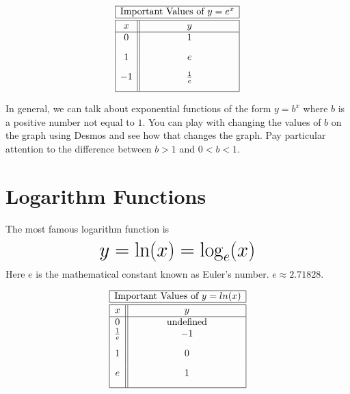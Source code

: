 \documentclass[nooutcomes]{ximera}
\begin{document}
$$
\begin{array}{ |c || c|  }
 \hline
 \multicolumn{2}{|c|}{\text{\normalfont Important Values of } y=e^x} \\
\hline
 \hline
 x & y\\
 \hline
 0&1\\[2ex]
 1&e\\[2ex]
 -1&\frac{1}{e}\\[2ex]
 \hline
\end{array}
$$

In general, we can talk about exponential functions of the form $y=b^{x}$ where $b$ is a positive number not equal to $1$.  You can play with changing the values of $b$ on the graph using Desmos and see how that changes the graph.  Pay particular attention to the difference between $b>1$ and $0<b<1$.

\begin{center}  
\end{center}




\newpage


\section{Logarithm Functions}


The most famous logarithm function is
 $$ \mbox{\huge $y=\ln(x)=\log_{e}(x)$}$$ 
Here $e$ is the mathematical constant known as Euler's number. $e \approx 2.71828$.

\begin{image}
\end{image}

$$
\begin{array}{ |c || c|  }
 \hline
 \multicolumn{2}{|c|}{\text{\normalfont Important Values of } y=ln(x)} \\
\hline
 \hline
 x & y\\
 \hline
0&\text{\normalfont undefined}\\ 
\frac{1}{e}&-1\\ [2ex]
1&0\\[2ex]
 e&1\\[2ex]
 \hline
\end{array}
$$
\end{document}
